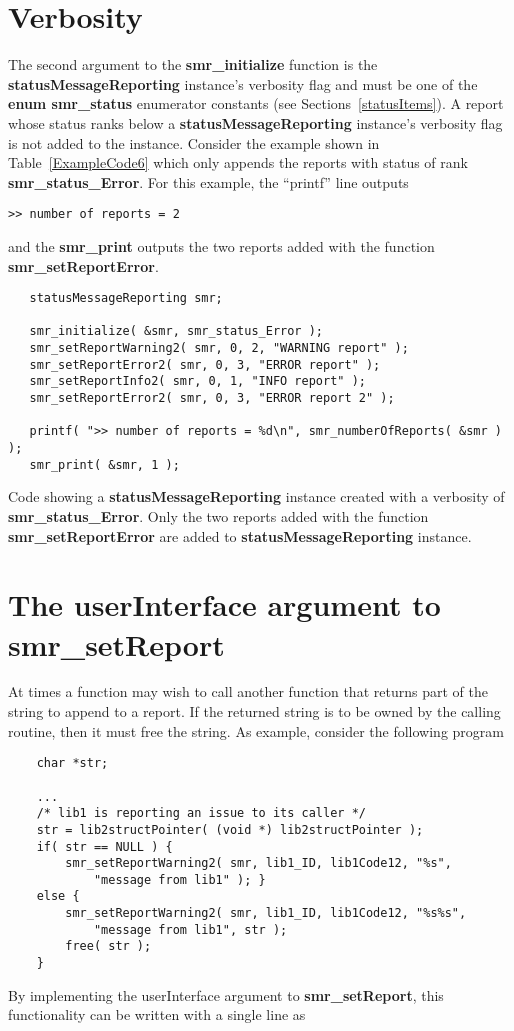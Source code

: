 \documentclass[11pt]{article}
\begin{document}
\section{Verbosity} \label{Verbosity}
The second argument to the \textbf{smr\_initialize} function is the \textbf{statusMessageReporting} instance's verbosity flag and must be one
of the \textbf{enum smr\_status} enumerator constants (see Sections~\ref{statusItems}).
A report whose status ranks below a \textbf{statusMessageReporting} instance's verbosity flag is not added to the instance.
Consider the example shown in Table~\ref{ExampleCode6} which only appends the reports with status of rank \textbf{smr\_status\_Error}.
For this example, the ``printf'' line outputs
\begin{verbatim}
>> number of reports = 2
\end{verbatim}
and the \textbf{smr\_print} outputs the two reports added with the function \textbf{smr\_setReportError}.

\begin{table}
\begin{verbatim}
   statusMessageReporting smr;

   smr_initialize( &smr, smr_status_Error );
   smr_setReportWarning2( smr, 0, 2, "WARNING report" );
   smr_setReportError2( smr, 0, 3, "ERROR report" );
   smr_setReportInfo2( smr, 0, 1, "INFO report" );
   smr_setReportError2( smr, 0, 3, "ERROR report 2" );

   printf( ">> number of reports = %d\n", smr_numberOfReports( &smr ) );
   smr_print( &smr, 1 );
\end{verbatim}
\caption{Code showing a \textbf{statusMessageReporting} instance created with a verbosity of \textbf{smr\_\-status\_\-Error}.
Only the two reports added with the function \textbf{smr\_setReport\-Error} are added to 
\textbf{status\-MessageReporting} instance.} \label{ExampleCode6}
\end{table}

\section{The userInterface argument to smr\_setReport}
At times a function may wish to call another function that returns part of the string to append to a report. If the returned string is
to be owned by the calling routine, then it must free the string. As example, consider the following program
\begin{verbatim}
    char *str;

    ...
    /* lib1 is reporting an issue to its caller */
    str = lib2structPointer( (void *) lib2structPointer );
    if( str == NULL ) {
        smr_setReportWarning2( smr, lib1_ID, lib1Code12, "%s",
            "message from lib1" ); }
    else {
        smr_setReportWarning2( smr, lib1_ID, lib1Code12, "%s%s",
            "message from lib1", str );
        free( str );
    }
\end{verbatim}
\noindent
By implementing the userInterface argument to \textbf{smr\_setReport}, this functionality can be written with a single line as
\end{document}
